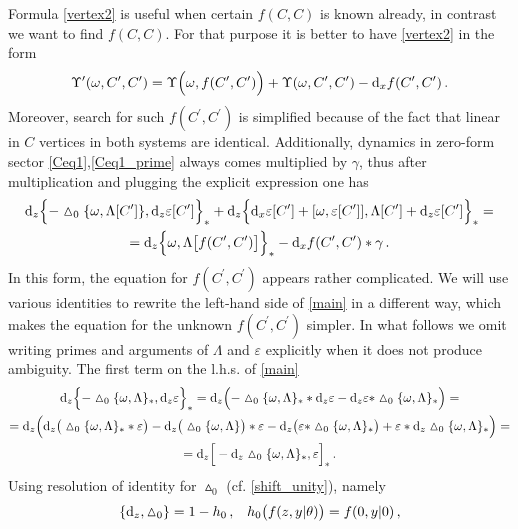 \documentclass[12pt]{article}
\newcommand{\dr}{{{\rm d}}}
\newcommand{\go}{\omega}
\newcommand{\hmt}{\vartriangle}
\begin{document}
Formula \eqref{vertex2} is useful when certain $f(C,C)$ is known already, in contrast we want to find $f(C,C)$. For that purpose it is better to have \eqref{vertex2} in the form 
\begin{equation}\label{vertex2_5}
\Upsilon^\prime(\go,C^\prime,C^\prime)=\Upsilon\Big(\go,f(C^\prime,C^\prime)\Big)+\Upsilon(\go,C^\prime,C^\prime)-\dr_x f(C^\prime,C^\prime)\,.
\end{equation}
Moreover, search for such $f(C^\prime,C^\prime)$ is simplified because of the fact that linear in $C$ vertices in both systems are identical. Additionally, dynamics in zero-form sector \eqref{Ceq1},\eqref{Ceq1_prime} always comes multiplied by $\gamma$, thus after multiplication and plugging the explicit expression one has
\begin{multline}\label{main}
\dr_z\Big\{-\hmt_0\{\go,\Lambda[C^\prime]\},\dr_z \varepsilon[C^\prime]\Big\}_\ast+\dr_z\Big\{\dr_x \varepsilon[C^\prime]+[\go,\varepsilon[C^\prime]],\Lambda[C^\prime]+\dr_z \varepsilon[C^\prime]\Big\}_\ast=\\
=\dr_z\Big\{\go,\Lambda\big[f(C^\prime,C^\prime)\big]\Big\}_\ast-\dr_x f(C^\prime,C^\prime)\ast \gamma\,.
\end{multline}
{In this form, the equation for $f(C^\prime,C^\prime)$ appears rather complicated. We will use various identities to rewrite the left‑hand side of \eqref{main} in a different way, which makes the equation for the unknown $f(C^\prime,C^\prime)$ simpler.} In what follows we omit writing primes and arguments of $\Lambda$ and $\varepsilon$ explicitly when it does not produce ambiguity. The first term on the l.h.s. of \eqref{main}
\begin{multline}\label{first}
\dr_z\Big\{-\hmt_0\{\go,\Lambda\}_\ast,\dr_z \varepsilon\Big\}_\ast=\dr_z\Big(-\hmt_0\{\go,\Lambda\}_\ast \ast \dr_z \varepsilon-\dr_z\varepsilon\ast \hmt_0\{\go,\Lambda\}_\ast\Big)=\\
=\dr_z\Big(\dr_z\big(\hmt_0\{\go,\Lambda\}_\ast \ast \varepsilon\big)-\dr_z\big(\hmt_0\{\go,\Lambda\}\big)\ast \varepsilon-\dr_z\big(\varepsilon\ast \hmt_0\{\go,\Lambda\}_\ast\big)+\varepsilon\ast \dr_z\hmt_0\{\go,\Lambda\}_\ast\Big)=\\
=\dr_z\Big[-\dr_z\hmt_0\{\go,\Lambda\}_\ast,\varepsilon\Big]_\ast\,.
\end{multline}
Using resolution of identity for $\hmt_0$ (cf. \eqref{shift_unity}), namely
\begin{equation}\label{unity}
\{\dr_z,\hmt_0\}=1-h_0\,, \;\;\; h_0\big(f(z,y|\theta)\big)=f(0,y|0)\,,
\end{equation}
\end{document}
